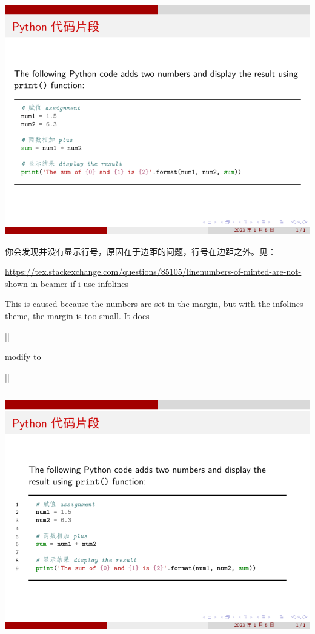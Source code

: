 \includegraphics{examples/beamer/code-listing-with-minted.pdf}

你会发现并没有显示行号，原因在于边距的问题，行号在边距之外。见：

\url{https://tex.stackexchange.com/questions/85105/linenumbers-of-minted-are-not-shown-in-beamer-if-i-use-infolines}

This is caused because the numbers are set in the margin, but with the infolines theme, the margin is too small. It does

||

modify to 

||

\inputminted[linenos=true]{latex}{examples/beamer/code-listing-change-text-margin.tex}

\includegraphics{examples/beamer/code-listing-change-text-margin.pdf}

